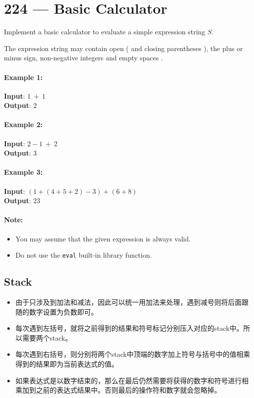 \section{224 --- Basic Calculator}
Implement a basic calculator to evaluate a simple expression string $S$.
\par
The expression string may contain open ( and closing parentheses ), the plus or minus sign, non-negative integers and empty spaces .

\paragraph{Example 1:}
\begin{flushleft}
\textbf{Input}: $1\ +\ 1$
\\
\textbf{Output}: 2
\end{flushleft}

\paragraph{Example 2:}
\begin{flushleft}
\textbf{Input}: $2-1\ +\ 2$
\\
\textbf{Output}: 3
\end{flushleft}

\paragraph{Example 3:}
\begin{flushleft}
\textbf{Input}: $(1+(4+5+2)-3)+(6+8)$
\\
\textbf{Output}: 23
\end{flushleft}

\paragraph{Note:}

\begin{itemize}
\item You may assume that the given expression is always valid.
\item Do not use the \texttt{eval} built-in library function.
\end{itemize}
\subsection{Stack}
\begin{itemize}
\item 由于只涉及到加法和减法，因此可以统一用加法来处理，遇到减号则将后面跟随的数字设置为负数即可。
\item 每次遇到左括号，就将之前得到的结果和符号标记分别压入对应的stack中。所以需要两个stack。
\item 每次遇到右括号，则分别将两个stack中顶端的数字加上符号与括号中的值相乘得到的结果即为当前表达式的值。
\item 如果表达式是以数字结束的，那么在最后仍然需要将获得的数字和符号进行相乘加到之前的表达式结果中。否则最后的操作符和数字就会忽略掉。
\end{itemize}

